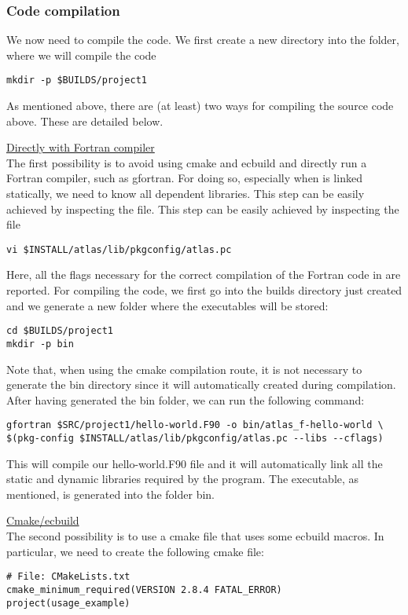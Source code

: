 \subsubsection*{Code compilation}
We now need to compile the code. We first create a new directory
into the  folder, where we will compile the code
%
\begin{lstlisting}[style=BashStyle]
mkdir -p $BUILDS/project1
\end{lstlisting}
%
As mentioned above, there are (at least) two ways for compiling 
the source code above. These are detailed below.
%
\begin{description}
%
\item \underline{Directly with Fortran compiler}\\[0.5em]
%
The first possibility is to avoid using cmake and ecbuild and 
directly run a Fortran compiler, such as gfortran.
For doing so, especially when \Atlas is linked statically,
we need to know all \Atlas dependent libraries. This step can be easily
achieved by inspecting the file. This step can be easily achieved by inspecting 
the file 
%
\begin{lstlisting}[style=BashStyle]
vi $INSTALL/atlas/lib/pkgconfig/atlas.pc
\end{lstlisting}
%
Here, all the flags necessary for the correct compilation 
of the Fortran code in  are reported. For 
compiling the code, we first go into the builds directory 
just created and we generate a new folder where the executables 
will be stored: 
%
\begin{lstlisting}[style=BashStyle]
cd $BUILDS/project1
mkdir -p bin
\end{lstlisting}
%
Note that, when using the cmake compilation route, it is not 
necessary to generate the bin directory since it will automatically 
created during compilation.
After having generated the bin folder, we can run the following 
command:
%
\begin{lstlisting}[style=BashStyle]
gfortran $SRC/project1/hello-world.F90 -o bin/atlas_f-hello-world \ 
$(pkg-config $INSTALL/atlas/lib/pkgconfig/atlas.pc --libs --cflags)
\end{lstlisting}
%
This will compile our hello-world.F90 file and it will automatically 
link all the static and dynamic libraries required by the program. 
The executable, as mentioned, is generated into the folder bin.
%
\item \underline{Cmake/ecbuild}\\[0.5em]
%
The second possibility is to use a cmake file that uses some 
ecbuild macros. In particular, we need to create the following 
cmake file:
%
\begin{lstlisting}[style=CMakeStyle]
# File: CMakeLists.txt
cmake_minimum_required(VERSION 2.8.4 FATAL_ERROR)
project(usage_example)


\end{lstlisting}
\end{description}
